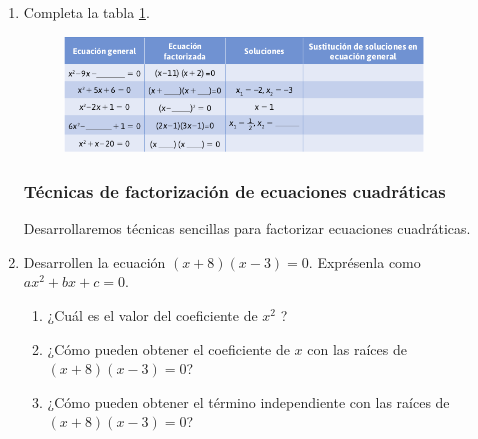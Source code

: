 \documentclass[11pt]{book}
\begin{document}
\begin{enumerate}
  \item Completa la tabla \ref{tab:table2.6}.

        \begin{figure}[H]
          \centering
          \includegraphics[width=0.9\textwidth]{table2.6.png}
          \label{tab:table2.6}
        \end{figure}

        \subsubsection{Técnicas de factorización de ecuaciones cuadráticas}
        Desarrollaremos técnicas sencillas para factorizar ecuaciones cuadráticas.

  \item Desarrollen la ecuación $(x + 8)(x - 3) = 0$. Exprésenla como $ax^2 + bx + c = 0$.
        \begin{enumerate}
          \item ¿Cuál es el valor del coeficiente de $x^2$ ?
          \item ¿Cómo pueden obtener el coeficiente de $x$ con las raíces de $(x + 8)(x - 3) = 0$?
          \item ¿Cómo pueden obtener el término independiente con las raíces de $(x + 8)(x - 3) = 0$?
        \end{enumerate}


\end{enumerate}
\end{document}
